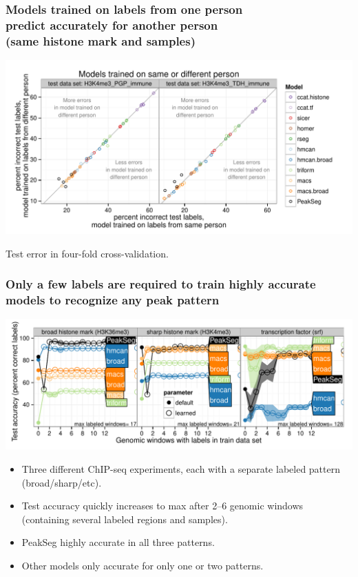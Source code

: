 \documentclass{beamer}
\begin{document}
\begin{frame}
  \frametitle{Models trained on labels from one person\\
predict accurately for another person\\
    (same histone mark and samples)}
  \includegraphics[width=1.1\textwidth]{figure-test-H3K4me3-annotators.pdf}

  Test error in four-fold cross-validation.
\end{frame}

\begin{frame}
  \frametitle{Only a few labels are required to train highly accurate models to recognize any peak pattern}
  \includegraphics[width=1.1\textwidth]{figure-test-error-decreases-mean.pdf}
 
  \begin{itemize}
  \item Three different ChIP-seq experiments, each with a separate
    labeled pattern (broad/sharp/etc).
  \item Test accuracy quickly increases to max after 2--6
    genomic windows (containing several labeled regions and samples).
  \item PeakSeg highly accurate in all three patterns.
  \item Other models only accurate for only one or two patterns.
  \end{itemize}
\end{frame}
\end{document}
